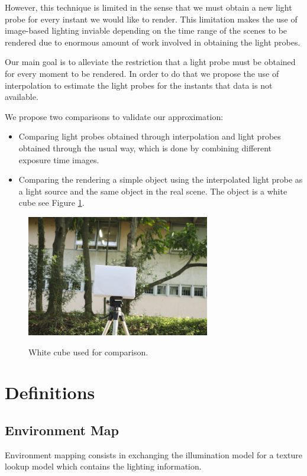 \documentclass[conference]{acmsiggraph}
\begin{document}
However, this technique is limited in the sense that we must obtain a new light probe for every instant we would like to render. This limitation makes the use of image-based lighting 
inviable depending on the time range of the scenes to be rendered due to enormous amount of work involved in obtaining the light probes.

Our main goal is to alleviate the restriction that a light probe must be obtained for every moment to be rendered. In order to do that we propose the use of interpolation to estimate 
the light probes for the instants that data is not available.

We propose two comparisons to validate our approximation:
\begin{itemize}
	\item Comparing light probes obtained through interpolation and light probes obtained through the usual way, which is done by combining different exposure time images.
	\item Comparing the rendering a simple object using the interpolated light probe as a light source and the same object in the real scene. The object is a white cube see Figure \ref{fig:whitecube}.
\end{itemize}

\begin{figure}[!ht]
	\caption{White cube used for comparison.}
	\centering
	\includegraphics[width=8cm]{images/ext2.jpg}
	\label{fig:whitecube}
\end{figure}

\section{Definitions}

\subsection{Environment Map}

	Environment mapping \cite{hughes2013} consists in exchanging the illumination model for a texture lookup model which contains the lighting information.
\end{document}

